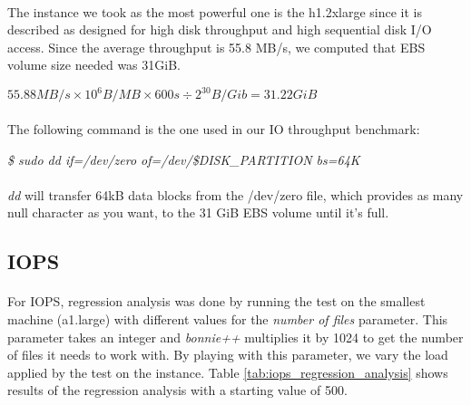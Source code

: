 \documentclass[11pt]{article}
\begin{document}
		\paragraph{} The instance we took as the most powerful one is the
		h1.2xlarge since it is described as designed for high disk throughput
		and high sequential disk I/O access. Since the average throughput is
		55.8 MB/s, we computed that EBS volume size needed was 31GiB.

		\begin{center}
			\(55.88 MB/s \times 10^6 B/MB \times 600s \div 2^{30} B/Gib = 31.22 GiB\)
		\end{center} 

		\paragraph{} The following command is the one used in our IO throughput benchmark: \bigskip

		\indent \textit{\$ sudo dd if=/dev/zero of=/dev/\$DISK\_PARTITION bs=64K}
	
		\paragraph{} \textit{dd} will transfer 64kB data blocks from the /dev/zero file,
		which provides as many null character as you want, to the 31 GiB EBS
		volume until it’s full.
	\subsection{IOPS}
		\paragraph{} For IOPS, regression analysis was done by running the test
		on the smallest machine (a1.large) with different values for the
		\emph{number of files} parameter. This parameter takes an integer and \emph{bonnie++}
		multiplies it by 1024 to get the number of files it needs to work with.
		By playing with this parameter, we vary the load applied by the test on the
		instance. Table \ref{tab:iops_regression_analysis} shows results of the regression analysis with a
		starting value of 500.
\end{document}

